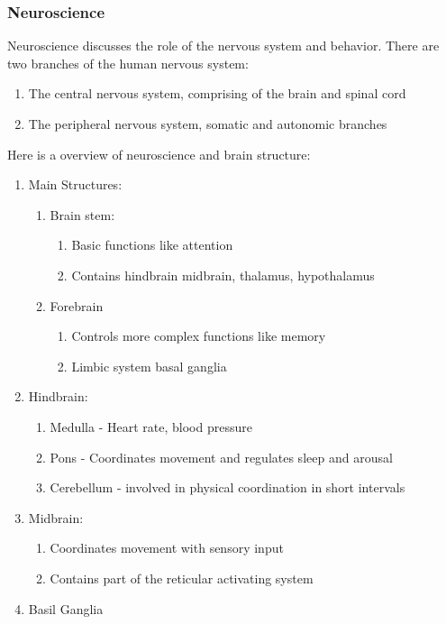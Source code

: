 \documentclass[12pt]{article}
\begin{document}
\subsubsection{Neuroscience}
Neuroscience discusses the role of the nervous system and
behavior. There are two branches of the human nervous system:
\begin{enumerate}
\item The central nervous system, comprising of the brain and spinal cord
\item The peripheral nervous system, somatic and autonomic branches
\end{enumerate}

Here is a overview of neuroscience and brain structure:
\begin{enumerate}
\item Main Structures:
  \begin{enumerate}
  \item Brain stem:
    \begin{enumerate}
    \item Basic functions like attention
    \item Contains hindbrain midbrain, thalamus, hypothalamus
    \end{enumerate}
  \item Forebrain
    \begin{enumerate}
    \item Controls more complex functions like memory
    \item Limbic system basal ganglia
    \end{enumerate}
  \end{enumerate}
\item Hindbrain:
  \begin{enumerate}
  \item Medulla - Heart rate, blood pressure
  \item Pons - Coordinates movement and regulates sleep and arousal
  \item Cerebellum - involved in physical coordination in short intervals
  \end{enumerate}
\item Midbrain:
  \begin{enumerate}
  \item Coordinates movement with sensory input
  \item Contains part of the reticular activating system 
  \end{enumerate}
\item Basil Ganglia

\end{enumerate}
\end{document}
